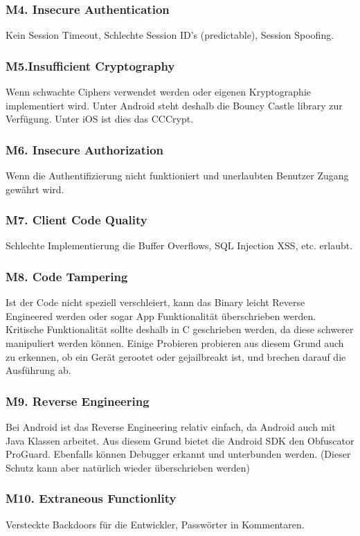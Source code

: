 \subsubsection{M4. Insecure Authentication}
Kein Session Timeout, Schlechte Session ID's (predictable), Session Spoofing. 

\subsubsection{M5.Insufficient Cryptography}
Wenn schwachte Ciphers verwendet werden oder eigenen Kryptographie implementiert wird. Unter Android steht deshalb die Bouncy Castle library zur Verfügung. Unter iOS ist dies das CCCrypt.

\subsubsection{M6. Insecure Authorization}
Wenn die Authentifizierung nicht funktioniert und unerlaubten Benutzer Zugang gewährt wird.

\subsubsection{M7. Client Code Quality}
Schlechte Implementierung die Buffer Overflows, SQL Injection XSS, etc. erlaubt.

\subsubsection{M8. Code Tampering}
Ist der Code nicht speziell verschleiert, kann das Binary leicht Reverse Engineered werden oder sogar App Funktionalität überschrieben werden. Kritische Funktionalität sollte deshalb in C geschrieben werden, da diese schwerer manipuliert werden können.
Einige Probieren probieren aus diesem Grund auch zu erkennen, ob ein Gerät gerootet oder gejailbreakt ist, und brechen darauf die Ausführung ab.

\subsubsection{M9. Reverse Engineering}
Bei Android ist das Reverse Engineering relativ einfach, da Android auch mit Java Klassen arbeitet. Aus diesem Grund bietet die Android SDK den Obfuscator ProGuard. Ebenfalls können Debugger erkannt und unterbunden werden. (Dieser Schutz kann aber natürlich wieder überschrieben werden)

\subsubsection{M10. Extraneous Functionlity}
Versteckte Backdoors für die Entwickler, Passwörter in Kommentaren.

